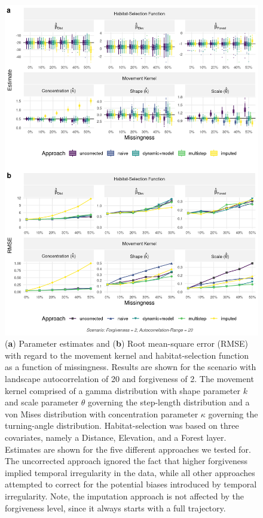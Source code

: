 \documentclass[abstract=on,10pt,a4paper,bibliography=totocnumbered]{article}
\begin{document}
\begin{figure}
  \begin{center}
  \includegraphics[width = \textwidth]{99_ModelComparisonMissingness.png}
  \caption{(\textbf{a}) Parameter estimates and (\textbf{b}) Root mean-square
  error (RMSE) with regard to the movement kernel and habitat-selection function
  as a function of missingness. Results are shown for the scenario with
  landscape autocorrelation of 20 and forgiveness of 2. The movement kernel
  comprised of a gamma distribution with shape parameter $k$ and scale parameter
  $\theta$ governing the step-length distribution and a von Mises distribution
  with concentration parameter $\kappa$ governing the turning-angle
  distribution. Habitat-selection was based on three covariates, namely a
  \textsf{Distance}, \textsf{Elevation}, and a \textsf{Forest} layer. Estimates
  are shown for the five different approaches we tested for. The uncorrected
  approach ignored the fact that higher forgiveness implied temporal
  irregularity in the data, while all other approaches attempted to correct for
  the potential biases introduced by temporal irregularity. Note, the imputation
  approach is not affected by the forgiveness level, since it always starts with
  a full trajectory.}
  \label{ModelComparisonMissingness}
  \end{center}
\end{figure}
\end{document}
